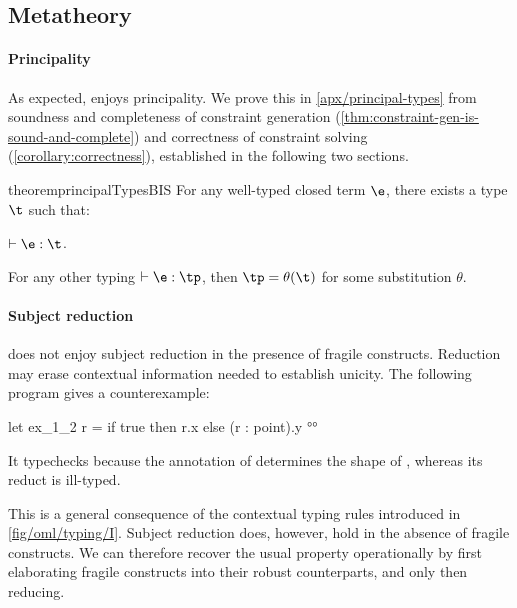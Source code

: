 \documentclass[acmsmall,screen,nonacm%
\Anonymous{,anonymous}{}%
\Final{}{,review}%
]{acmart}
\begin{document}
\subsection{Metatheory}
\label{sec/oml/metatheory}

\paragraph{Principality}

As expected, \OML enjoys principality. We prove this in
\cref{apx/principal-types} from soundness and completeness of constraint
generation (\cref{thm:constraint-gen-is-sound-and-complete}) and correctness of
constraint solving (\cref{corollary:correctness}), established in the
following two sections.

\begin{restatable}{theorem}{principalTypesBIS}
\label{thm:principal-types}
For any well-typed closed \OML term $\e$, there exists a type $\t$
such that:
\begin{enumerate*}[(\roman*)]
\item
  $\th \e : \t$.
\item
  For any other typing $\th \e : \tp$, then $\tp = \theta(\t)$ for some
  substitution $\theta$.
\end{enumerate*}
\end{restatable}

\paragraph{Subject reduction}

\OML does not enjoy subject reduction in the presence of fragile constructs.
Reduction may erase contextual information needed to establish unicity. 
The following program gives a counterexample:
\begin{program}[input]
let ex_1_2 r = if true then r.x else (r : point).y      °°
\end{program}
%
It typechecks because the annotation of 
determines the shape of , whereas its reduct  is ill-typed. 

This is a general consequence of the contextual typing rules introduced in
\cref{fig/oml/typing/I}. Subject reduction does, however, hold in the absence
of fragile constructs. We can therefore recover the usual property
operationally by first elaborating fragile constructs into their robust
counterparts, and only then reducing. 
\end{document}
